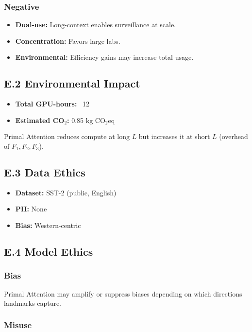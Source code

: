 \subsubsection{Negative}
\begin{itemize}
\item \textbf{Dual-use:} Long-context enables surveillance at scale.
\item \textbf{Concentration:} Favors large labs.
\item \textbf{Environmental:} Efficiency gains may increase total usage.

\end{itemize}
\subsection{E.2 Environmental Impact}

\begin{itemize}
\item \textbf{Total GPU-hours:} ~12
\item \textbf{Estimated CO$_2$:} 0.85 kg CO$_2$eq

\end{itemize}
Primal Attention reduces compute at long $L$ but increases it at short $L$ 
(overhead of $F_1, F_2, F_3$).

\subsection{E.3 Data Ethics}

\begin{itemize}
\item \textbf{Dataset:} SST-2 (public, English)
\item \textbf{PII:} None
\item \textbf{Bias:} Western-centric

\end{itemize}
\subsection{E.4 Model Ethics}

\subsubsection{Bias}

Primal Attention may amplify or suppress biases depending on which directions 
landmarks capture.

\subsubsection{Misuse}

